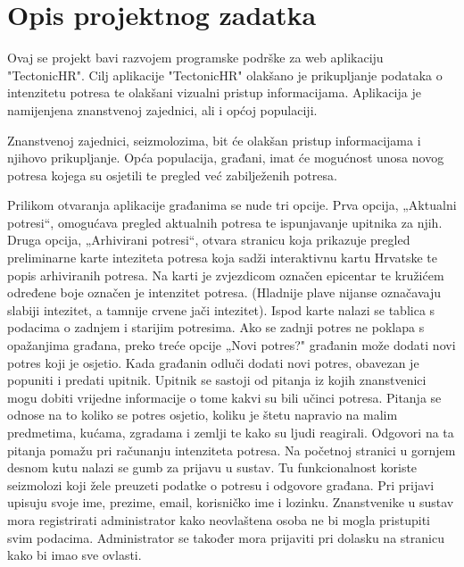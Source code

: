 \chapter{Opis projektnog zadatka}
		


{Ovaj se projekt bavi razvojem programske podrške za web aplikaciju "TectonicHR". 
	Cilj aplikacije "TectonicHR" olakšano je prikupljanje podataka o intenzitetu potresa te olakšani vizualni pristup informacijama. 
	Aplikacija je namijenjena znanstvenoj zajednici, ali i općoj populaciji.
	
	 
	Znanstvenoj zajednici, seizmolozima, bit će olakšan pristup informacijama i njihovo prikupljanje.  
	Opća populacija, građani, imat će mogućnost unosa novog potresa kojega su osjetili te pregled već zabilježenih potresa.  
	
	
	Prilikom otvaranja aplikacije građanima se nude tri opcije. Prva opcija, „Aktualni potresi“, omogućava pregled aktualnih potresa te ispunjavanje upitnika za njih. Druga opcija, „Arhivirani potresi“, otvara stranicu koja prikazuje pregled preliminarne karte inteziteta potresa koja sadži interaktivnu kartu Hrvatske te popis arhiviranih potresa. 
	Na karti je zvjezdicom označen epicentar te kružićem određene boje označen je intenzitet potresa. (Hladnije plave nijanse označavaju slabiji intezitet, a tamnije crvene jači intezitet). 
	Ispod karte nalazi se tablica s podacima o zadnjem i starijim potresima. 
	Ako se zadnji potres ne poklapa s opažanjima građana, preko treće opcije „Novi potres?" građanin može dodati novi potres koji je osjetio. 
	Kada građanin odluči dodati novi potres, obavezan je popuniti i predati upitnik. 
	Upitnik se sastoji od pitanja iz kojih znanstvenici mogu dobiti vrijedne informacije o tome kakvi su bili učinci potresa. 
	Pitanja se odnose na to koliko se potres osjetio, koliku je štetu napravio na malim predmetima, kućama, zgradama i zemlji te kako su ljudi reagirali. 
	Odgovori na ta pitanja pomažu pri računanju intenziteta potresa. 
	Na početnoj stranici u gornjem desnom kutu nalazi se gumb za prijavu u sustav. Tu funkcionalnost koriste seizmolozi koji žele preuzeti podatke o potresu i odgovore građana.  Pri prijavi upisuju svoje ime, prezime, email, korisničko ime i lozinku. Znanstvenike u sustav mora registrirati administrator kako neovlaštena osoba ne bi mogla pristupiti svim podacima. Administrator se također mora prijaviti pri dolasku na stranicu kako bi imao sve ovlasti. \\
	
	}
	
